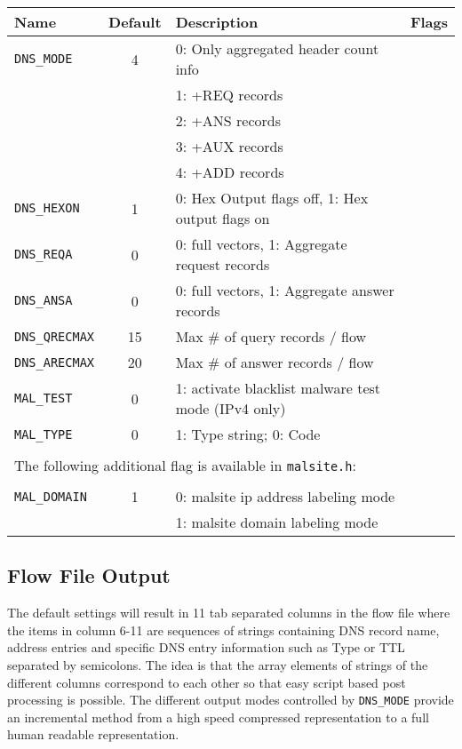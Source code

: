 \documentclass[documentation]{subfiles}
\begin{document}
\begin{longtable}{lcll}
    \toprule
    {\bf Name} & {\bf Default} & {\bf Description} & {\bf Flags}\\
    \midrule\endhead%
    {\tt DNS\_MODE}    &  4 & 0: Only aggregated header count info \\
                       &    & 1: +REQ records \\
                       &    & 2: +ANS records \\
                       &    & 3: +AUX records \\
                       &    & 4: +ADD records\\
    {\tt DNS\_HEXON}   &  1 & 0: Hex Output flags off, 1: Hex output flags on\\
    {\tt DNS\_REQA}    &  0 & 0: full vectors, 1: Aggregate request records\\
    {\tt DNS\_ANSA}    &  0 & 0: full vectors, 1: Aggregate answer records\\
    {\tt DNS\_QRECMAX} & 15 & Max \# of query records / flow \\
    {\tt DNS\_ARECMAX} & 20 & Max \# of answer records / flow \\
    {\tt MAL\_TEST}    & 0 & 1: activate blacklist malware test mode (IPv4 only) \\
    {\tt MAL\_TYPE}    & 0 & 1: Type string; 0: Code \\\\

    \multicolumn{3}{l}{The following additional flag is available in {\tt malsite.h}:}\\\\

    {\tt MAL\_DOMAIN} & 1 & 0: malsite ip address labeling mode \\
                      &   & 1: malsite domain labeling mode\\
    \bottomrule
\end{longtable}


\subsection{Flow File Output}
The default settings will result in 11 tab separated columns in the flow file where the items
in column 6-11 are sequences of strings containing DNS record name, address entries and specific
DNS entry information such as Type or TTL separated by semicolons. The idea is that the array elements of strings of the
different columns correspond to each other so that easy script based post processing is possible.
The different output modes controlled by {\tt DNS\_MODE} provide an incremental method from a high speed
compressed representation to a full human readable representation.
\end{document}
